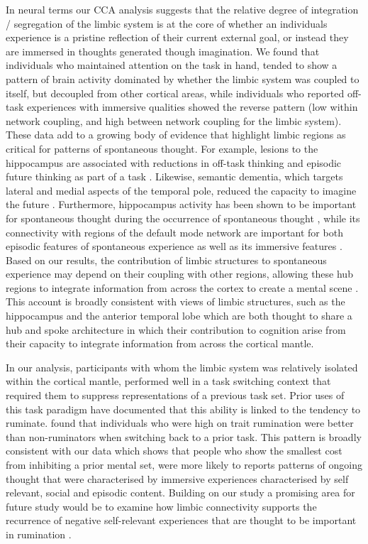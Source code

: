 In neural terms our CCA analysis suggests that the relative degree of integration / segregation of the limbic system is at the core of whether an individuals experience is a pristine reflection of their current external goal, or instead they are immersed in thoughts generated though imagination. We found that individuals who maintained attention on the task in hand, tended to show a pattern of brain activity dominated by whether the limbic system was coupled to itself, but decoupled from other cortical areas, while individuals who reported off-task experiences with immersive qualities showed the reverse pattern (low within network coupling, and high between network coupling for the limbic system). These data add to a growing body of evidence that highlight limbic regions as critical for patterns of spontaneous thought. For example, lesions to the hippocampus are associated with reductions in off-task thinking \cite{McCormick2018} and episodic future thinking as part of a task \cite{Maguire2011,Race2011}. Likewise, semantic dementia, which targets lateral and medial aspects of the temporal pole, reduced the capacity to imagine the future \cite{Irish2012,Viard2014}. Furthermore, hippocampus activity has been shown to be important for spontaneous thought during the occurrence of spontaneous thought \cite{Ellamil2016}, while its connectivity with regions of the default mode network are important for both episodic features of spontaneous experience \cite{Karapanagiotidis2017} as well as its immersive features \cite{Smallwood2016}. Based on our results, the contribution of limbic structures to spontaneous experience may depend on their coupling with other regions, allowing these hub regions to integrate information from across the cortex to create a mental scene \cite{Hassabis2009}. This account is broadly consistent with views of limbic structures, such as the hippocampus \cite{Moscovitch2016} and the anterior temporal lobe \cite{Lambon-Ralph2017} which are both thought to share a hub and spoke architecture in which their contribution to cognition arise from their capacity to integrate information from across the cortical mantle.

In our analysis, participants with whom the limbic system was relatively isolated within the cortical mantle, performed well in a task switching context that required them to suppress representations of a previous task set. Prior uses of this task paradigm have documented that this ability is linked to the tendency to ruminate.  found that individuals who were high on trait rumination were better than non-ruminators when switching back to a prior task. This pattern is broadly consistent with our data which shows that people who show the smallest cost from inhibiting a prior mental set, were more likely to reports patterns of ongoing thought that were characterised by immersive experiences characterised by self relevant, social and episodic content. Building on our study a promising area for future study would be to examine how limbic connectivity supports the recurrence of negative self-relevant experiences that are thought to be important in rumination \cite{Kleckner2017,Peters2016,Cooney2010}. 

